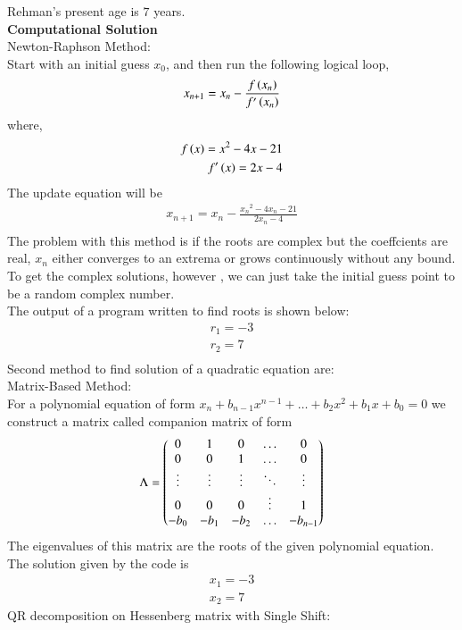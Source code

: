 \documentclass[journal]{IEEEtran}
\begin{document}
	Rehman's present age is $7$ years.\\
	\textbf{Computational Solution}\\
	Newton-Raphson Method:\\
	Start with an initial guess $x_0$, and then run the following logical loop,
	\begin{align}
		x_{n+1} = x_n - \frac{f\left(x_n\right)}{f^{\prime}\left(x_n\right)} 
	\end{align}
	where,
	\begin{align}
		f\left(x\right) = x^2 - 4x - 21\\
		f^{\prime}\left(x\right) = 2x - 4\\
	\end{align}
	The update equation will be
	\begin{align}
		x_{n+1} = x_n - \frac{{x_n}^2 - 4x_n - 21}{2x_n - 4}\\
	\end{align}
	The problem with this method is if the roots are complex but the coeffcients are real, $x_n$ either converges to an extrema or grows continuously without any bound.
	To get the complex solutions, however , we can just take the initial guess point to be a 
	random complex number.\\
	The output of a program written to find roots is shown below:
	\begin{align}
		r_1 = -3\\
		r_2 = 7\\
	\end{align}
	Second method to find solution of a quadratic equation are:\\
	Matrix-Based Method:\\
	For a polynomial equation of form $x_n+b_{n-1}x^{n-1}+\dots+b_2x^2+b_1x+b_0 = 0$ we construct a matrix called companion matrix of form
	\begin{align}
		\Lambda = \begin{pmatrix}0&1&0&\dots&0\\ 0&0&1&\dots&0\\ \vdots &\vdots &\vdots &\ddots&\vdots\\0&0&0&\vdots&1\\-b_0&-b_1&-b_2&\dots&-b_{n-1}\end{pmatrix}
	\end{align}
	The eigenvalues of this matrix are the roots of the given polynomial equation.\\
	The solution given by the code is
	\begin{align}
		x_1 = -3\\
		x_2 = 7
	\end{align}
	QR decomposition on Hessenberg matrix with Single Shift:\\
\end{document}
